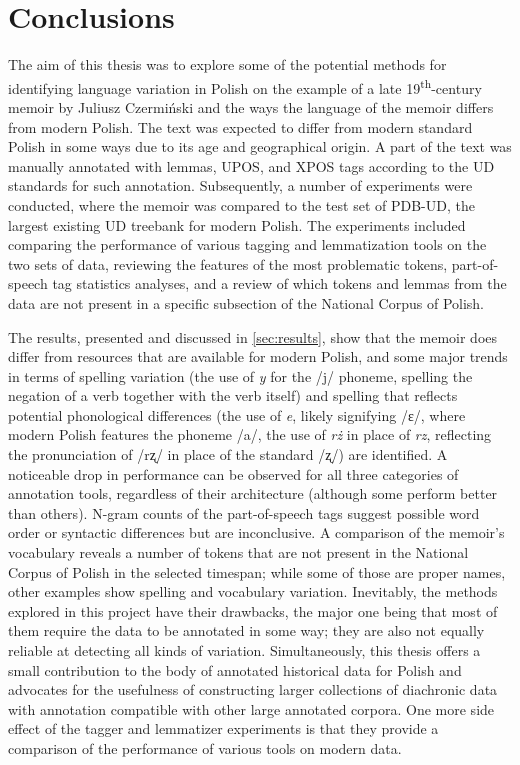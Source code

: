 \section{Conclusions}
\label{sec:conclusions}

The aim of this thesis was to explore some of the potential methods for identifying language variation in Polish on the example of a late 19\textsuperscript{th}-century memoir by Juliusz Czermiński and the ways the language of the memoir differs from modern Polish. The text was expected to differ from modern standard Polish in some ways due to its age and geographical origin. A part of the text was manually annotated with lemmas, UPOS, and XPOS tags according to the UD standards for such annotation. Subsequently, a number of experiments were conducted, where the memoir was compared to the test set of PDB-UD, the largest existing UD treebank for modern Polish. The experiments included comparing the performance of various tagging and lemmatization tools on the two sets of data, reviewing the features of the most problematic tokens, part-of-speech tag statistics analyses, and a review of which tokens and lemmas from the data are not present in a specific subsection of the National Corpus of Polish.

The results, presented and discussed in \autoref{sec:results}, show that the memoir does differ from resources that are available for modern Polish, and some major trends in terms of spelling variation (the use of \textit{y} for the /j/ phoneme, spelling the negation of a verb together with the verb itself) and spelling that reflects potential phonological differences (the use of \textit{e}, likely signifying /ɛ/, where modern Polish features the phoneme /a/, the use of \textit{rż} in place of \textit{rz}, reflecting the pronunciation of /rʐ/ in place of the standard /ʐ/) are identified. A noticeable drop in performance can be observed for all three categories of annotation tools, regardless of their architecture (although some perform better than others). N-gram counts of the part-of-speech tags suggest possible word order or syntactic differences but are inconclusive. A comparison of the memoir's vocabulary reveals a number of tokens that are not present in the National Corpus of Polish in the selected timespan; while some of those are proper names, other examples show spelling and vocabulary variation. Inevitably, the methods explored in this project have their drawbacks, the major one being that most of them require the data to be annotated in some way; they are also not equally reliable at detecting all kinds of variation. Simultaneously, this thesis offers a small contribution to the body of annotated historical data for Polish and advocates for the usefulness of constructing larger collections of diachronic data with annotation compatible with other large annotated corpora. One more side effect of the tagger and lemmatizer experiments is that they provide a comparison of the performance of various tools on modern data.

